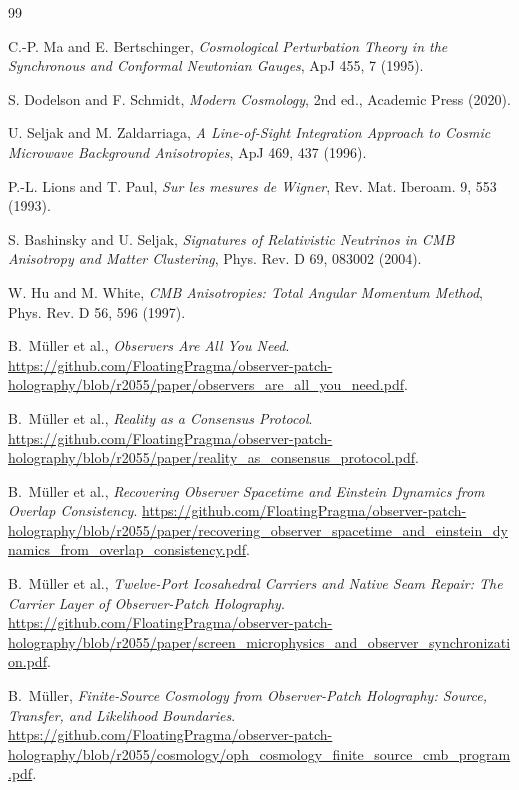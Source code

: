\documentclass[11pt]{article}
\theoremstyle{remark}
\begin{document}
\begin{thebibliography}{99}

C.-P. Ma and E. Bertschinger, \emph{Cosmological Perturbation Theory
in the Synchronous and Conformal Newtonian Gauges}, ApJ 455, 7 (1995).

S. Dodelson and F. Schmidt, \emph{Modern Cosmology}, 2nd ed., Academic
Press (2020).

U. Seljak and M. Zaldarriaga, \emph{A Line-of-Sight Integration
Approach to Cosmic Microwave Background Anisotropies}, ApJ 469, 437 (1996).

P.-L. Lions and T. Paul, \emph{Sur les mesures de Wigner}, Rev. Mat.
Iberoam. 9, 553 (1993).

S. Bashinsky and U. Seljak, \emph{Signatures of Relativistic Neutrinos
in CMB Anisotropy and Matter Clustering}, Phys. Rev. D 69, 083002 (2004).

W. Hu and M. White, \emph{CMB Anisotropies: Total Angular Momentum
Method}, Phys. Rev. D 56, 596 (1997).

B.~M\"uller et al., \emph{Observers Are All You Need}.
\url{https://github.com/FloatingPragma/observer-patch-holography/blob/r2055/paper/observers_are_all_you_need.pdf}.

B.~M\"uller et al., \emph{Reality as a Consensus Protocol}.
\url{https://github.com/FloatingPragma/observer-patch-holography/blob/r2055/paper/reality_as_consensus_protocol.pdf}.

B.~M\"uller et al., \emph{Recovering Observer Spacetime and Einstein
Dynamics from Overlap Consistency}.
\url{https://github.com/FloatingPragma/observer-patch-holography/blob/r2055/paper/recovering_observer_spacetime_and_einstein_dynamics_from_overlap_consistency.pdf}.

B.~M\"uller et al., \emph{Twelve-Port Icosahedral Carriers and Native Seam Repair: The Carrier Layer of Observer-Patch Holography}.
\url{https://github.com/FloatingPragma/observer-patch-holography/blob/r2055/paper/screen_microphysics_and_observer_synchronization.pdf}.

B.~M\"uller, \emph{Finite-Source Cosmology from Observer-Patch Holography:
Source, Transfer, and Likelihood Boundaries}.
\url{https://github.com/FloatingPragma/observer-patch-holography/blob/r2055/cosmology/oph_cosmology_finite_source_cmb_program.pdf}.


\end{thebibliography}
\end{document}

